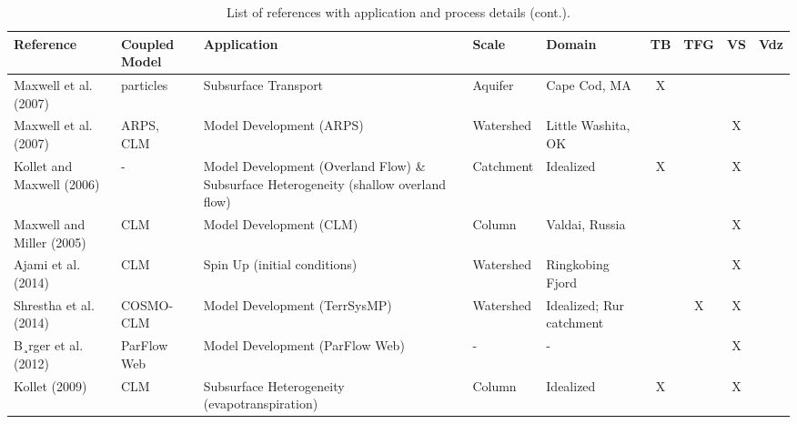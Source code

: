 {\begin{table}
\caption{List of \parflow{} references with application and process details (cont.).}

\begin{tabular}{ l  p{1.5cm} p{2cm} p{1.5cm} p{1.5cm} | c | c | c | c }
\bf{Reference} & \bf{Coupled Model} & \bf{Application} & \bf{Scale} & \bf{Domain} & \bf{TB} & \bf{TFG} & \bf{VS} & \bf{Vdz} \\ 
\hline{}

\cite{MWH07} Maxwell et al. (2007) & particles & Subsurface Transport & Aquifer & Cape Cod, MA & X &   &   &     \\
\cite{MCK07} Maxwell et al. (2007) & ARPS, CLM & Model Development (ARPS) & Watershed & Little Washita, OK &   &   & X &     \\
\cite{KM06} Kollet and Maxwell (2006) & - & Model Development (Overland Flow) \& Subsurface Heterogeneity (shallow overland flow) & Catchment & Idealized & X &   & X &     \\
\cite{MM05} Maxwell and Miller (2005) & CLM & Model Development (CLM) & Column & Valdai, Russia &   &   & X &     \\
\cite{Ajami14} Ajami et al. (2014) & CLM & Spin Up (initial conditions) & Watershed & Ringkobing Fjord &   &   & X &     \\
\cite{Shrestha14} Shrestha et al. (2014) & COSMO-CLM & Model Development (TerrSysMP) & Watershed & Idealized; Rur catchment &   & X & X &     \\
\cite{Burger12} B¸rger et al. (2012) & ParFlow Web & Model Development (ParFlow Web)& - & - &   &   & X &     \\
\cite{K09} Kollet (2009) & CLM & Subsurface Heterogeneity (evapotranspiration) & Column & Idealized & X &   & X &     \\
\end{tabular}
\label{pfref4}
\end{table}

}
